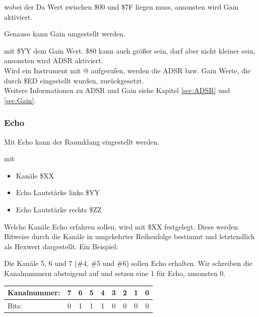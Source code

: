 \medskip

wobei der Da Wert zwischen \$00 und \$7F liegen muss, ansonsten wird Gain aktiviert.

\bigskip

Genauso kann Gain umgestellt werden.

\medskip



\medskip

mit \$YY dem Gain Wert. \$80 kann auch größer sein, darf aber nicht kleiner sein, ansonsten wird ADSR aktiviert. \\

Wird ein Instrument mit @ aufgerufen, werden die ADSR bzw. Gain Werte, die durch \$ED eingestellt wurden, zurückgesetzt. \\
Weitere Informationen zu ADSR und Gain siehe Kapitel \ref{sec:ADSR} und \ref{sec:Gain}.

\subsubsection{Echo}

Mit Echo kann der Raumklang eingestellt werden.

\medskip



\medskip

mit

\begin{itemize}
	\item Kanäle \$XX
	\item Echo Lautstärke links \$YY
	\item Echo Lautstärke rechts \$ZZ
\end{itemize}

Welche Kanäle Echo erfahren sollen, wird mit \$XX festgelegt. Diese werden Bitweise durch die Kanäle in umgekehrter Reihenfolge bestimmt und letztendlich als Hexwert dargestellt. Ein Beispiel:

\bigskip

Die Kanäle 5, 6 und 7 (\#4, \#5 und \#6) sollen Echo erhalten. Wir schreiben die Kanalnummern absteigend auf und setzen eine 1 für Echo, ansonsten 0.

\begin{table}[htbp]
	\centering
	\begin{tabularx}{8.5cm}{|X|c|c|c|c|c|c|c|c|}
		\hline
		Kanalnummer: & 7 & 6 & 5 & 4 & 3 & 2 & 1 & 0 \\
		\hline
		Bits: & 0 & 1 & 1 & 1 & 0 & 0 & 0 & 0 \\
		\hline
	\end{tabularx}
\end{table}


